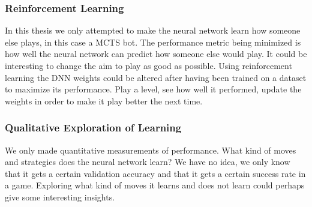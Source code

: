 \documentclass{kththesis}
\begin{document}
\subsubsection{Reinforcement Learning}
In this thesis we only attempted to make the neural network learn how someone else plays, in this case a MCTS bot. The performance metric being minimized is how well the neural network can predict how someone else would play. It could be interesting to change the aim to play as good as possible. Using reinforcement learning the DNN weights could be altered after having been trained on a dataset to maximize its performance. Play a level, see how well it performed, update the weights in order to make it play better the next time. 

\subsubsection{Qualitative Exploration of Learning}
We only made quantitative measurements of performance. What kind of moves and strategies does the neural network learn? We have no idea, we only know that it gets a certain validation accuracy and that it gets a certain success rate in a game. Exploring what kind of moves  it learns and does not learn could perhaps give some interesting insights.






\end{document}
